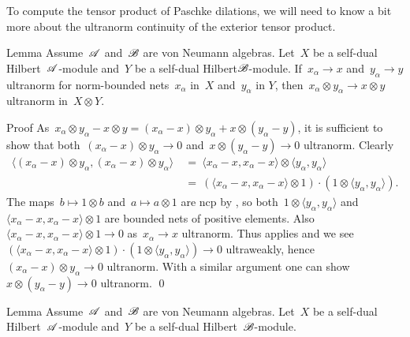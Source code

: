 \documentclass[b]{subfiles}
\begin{document}
\begin{parsec}%
\begin{point}%
To compute the tensor product of Paschke dilations,
    we will need to know a bit more about
    the ultranorm continuity of the exterior tensor product.
\end{point}
\begin{point}{Lemma}%
Assume~$\mathscr{A}$ and~$\mathscr{B}$ are von Neumann algebras.
Let~$X$ be a self-dual Hilbert~$\mathscr{A}$-module
    and~$Y$ be a self-dual Hilbert$\mathscr{B}$-module.
If~$x_\alpha \to x$ and~$y_\alpha \to y$ ultranorm
    for norm-bounded nets~$x_\alpha$ in~$X$ and~$y_\alpha$ in $Y$,
    then~$x_\alpha \otimes y_\alpha \to x \otimes y$
    ultranorm in~$X \otimes Y$.
\begin{point}{Proof}%
As~$x_\alpha \otimes y_\alpha - x \otimes y
            = (x_\alpha -x )\otimes y_\alpha + x\otimes (y_\alpha - y)$,
            it is sufficient
    to show that both~$(x_\alpha -x) \otimes y_\alpha \to 0$
    and~$x\otimes (y_\alpha - y) \to 0$ ultranorm.
Clearly
\begin{align*}
    \langle (x_\alpha - x) \otimes y_\alpha,
        (x_\alpha - x) \otimes y_\alpha \rangle
    & \ = \ 
    \langle x_\alpha - x , x_\alpha - x \rangle\otimes 
    \langle y_\alpha ,y_\alpha \rangle \\
    & \ = \ 
    (\langle x_\alpha - x , x_\alpha - x \rangle\otimes 1) \cdot (1 \otimes 
    \langle y_\alpha ,y_\alpha \rangle ).
\end{align*}
The maps~$b \mapsto 1 \otimes b$ and~$a \mapsto a \otimes 1$
    are ncp by \TODO{},
    so both~$1 \otimes \langle y_\alpha, y_\alpha \rangle$
    and~$\langle x_\alpha - x , x_\alpha - x \rangle\otimes 1$
    are bounded nets of positive elements.
    Also~$\langle x_\alpha - x , x_\alpha - x \rangle\otimes 1 \to 0$
        as~$x_\alpha \to x$ ultranorm.
Thus \sref{vanishing-effects} applies and we see
    $(\langle x_\alpha - x , x_\alpha - x \rangle\otimes 1) \cdot (1 \otimes 
    \langle y_\alpha ,y_\alpha \rangle ) \to 0$ ultraweakly,
    hence~$(x_\alpha - x) \otimes y_\alpha \to 0$ ultranorm.
With a similar argument
    one can show~$x\otimes (y_\alpha - y) \to 0$ ultranorm. \qed
\end{point}
\end{point}
\begin{point}{Lemma}%
Assume~$\mathscr{A}$ and~$\mathscr{B}$ are von Neumann algebras.
Let~$X$ be a self-dual Hilbert~$\mathscr{A}$-module
    and~$Y$ be a self-dual Hilbert~$\mathscr{B}$-module.

\end{point}
\end{parsec}
\end{document}
